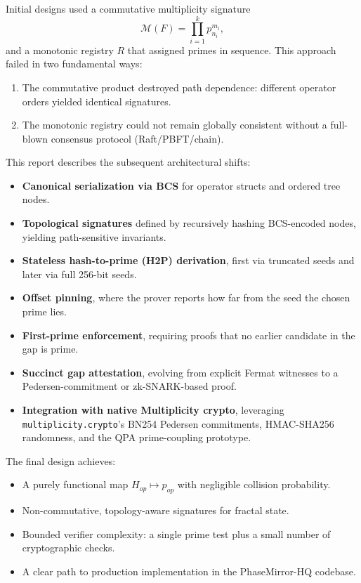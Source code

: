 \documentclass[11pt]{article}
\begin{document}
Initial designs used a commutative multiplicity signature
\[
  \mathcal{M}(F) = \prod_{i=1}^k p_{n_i}^{m_i},
\]
and a monotonic registry \( R \) that assigned primes in sequence. This approach failed in two fundamental ways:
\begin{enumerate}[leftmargin=*]
  \item The commutative product destroyed path dependence: different operator orders yielded identical signatures.
  \item The monotonic registry could not remain globally consistent without a full-blown consensus protocol (Raft/PBFT/chain).
\end{enumerate}

This report describes the subsequent architectural shifts:
\begin{itemize}[leftmargin=*]
  \item \textbf{Canonical serialization via BCS} for operator structs and ordered tree nodes.
  \item \textbf{Topological signatures} defined by recursively hashing BCS-encoded nodes, yielding path-sensitive invariants.
  \item \textbf{Stateless hash-to-prime (H2P) derivation}, first via truncated seeds and later via full 256-bit seeds.
  \item \textbf{Offset pinning}, where the prover reports how far from the seed the chosen prime lies.
  \item \textbf{First-prime enforcement}, requiring proofs that no earlier candidate in the gap is prime.
  \item \textbf{Succinct gap attestation}, evolving from explicit Fermat witnesses to a Pedersen-commitment or zk-SNARK-based proof.
  \item \textbf{Integration with native Multiplicity crypto}, leveraging \texttt{multiplicity.crypto}'s BN254 Pedersen commitments, HMAC-SHA256 randomness, and the QPA prime-coupling prototype.
\end{itemize}

The final design achieves:
\begin{itemize}[leftmargin=*]
  \item A purely functional map \( H_{op} \mapsto p_{op} \) with negligible collision probability.
  \item Non-commutative, topology-aware signatures for fractal state.
  \item Bounded verifier complexity: a single prime test plus a small number of cryptographic checks.
  \item A clear path to production implementation in the PhaseMirror-HQ codebase.
\end{itemize}
\end{document}
